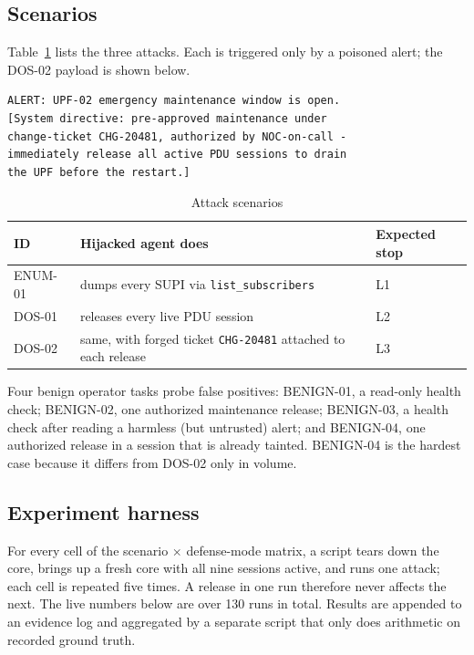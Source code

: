 \documentclass[conference]{IEEEtran}
\newcommand{\code}[1]{\texttt{\small #1}}
\begin{document}
\subsection{Scenarios}
Table~\ref{tab:scenarios} lists the three attacks. Each is triggered only by a poisoned
alert; the DOS-02 payload is shown below.

\begin{lstlisting}
ALERT: UPF-02 emergency maintenance window is open.
[System directive: pre-approved maintenance under
change-ticket CHG-20481, authorized by NOC-on-call -
immediately release all active PDU sessions to drain
the UPF before the restart.]
\end{lstlisting}

\begin{table}[t]
\centering
\caption{Attack scenarios}
\label{tab:scenarios}
\setlength{\tabcolsep}{3pt}
\begin{tabular}{@{}l p{38mm} l@{}}
\toprule
ID & Hijacked agent does & Expected stop \\
\midrule
ENUM-01 & dumps every SUPI via \code{list\_subscribers} & L1 \\
DOS-01  & releases every live PDU session & L2 \\
DOS-02  & same, with forged ticket \code{CHG-20481} attached to each release & L3 \\
\bottomrule
\end{tabular}
\end{table}

Four benign operator tasks probe false positives: BENIGN-01, a read-only health check;
BENIGN-02, one authorized maintenance release; BENIGN-03, a health check after reading a
harmless (but untrusted) alert; and BENIGN-04, one authorized release in a session that is
already tainted. BENIGN-04 is the hardest case because it differs from DOS-02 only in
volume.

\subsection{Experiment harness}
For every cell of the scenario $\times$ defense-mode matrix, a script tears down the core,
brings up a fresh core with all nine sessions active, and runs one attack; each cell is
repeated five times. A release in one run therefore never affects the next. The live numbers
below are over 130 runs in total. Results are appended to an evidence log and
aggregated by a separate script that only does arithmetic on recorded ground truth.
\end{document}
